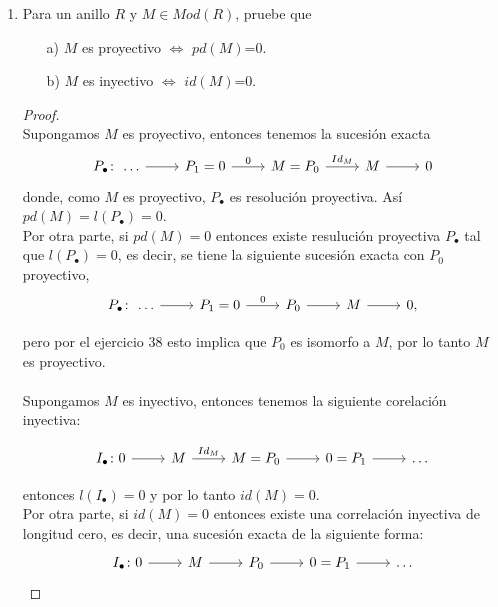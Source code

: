 \documentclass{article}
\begin{document}
\begin{enumerate}[label=\textbf{Ej \arabic*.}]
		\item Para un anillo $R$ y $M\in Mod(R)$, pruebe que 
		\begin{itemize}
			\item[a)] $M$ es proyectivo $\iff$  $pd(M)$=0.
			\item[b)] $M$ es inyectivo $\iff$  $id(M)$=0.
		\end{itemize}
		\begin{proof}
			\\
			Supongamos $M$ es proyectivo, entonces tenemos la sucesión exacta 
			\[
			\begin{tikzcd}
				P_\bullet \colon\,\ldots\arrow{r}{} & P_1=0 \arrow{r}{0}& M=P_0 \arrow{r}{Id_M} & M\arrow{r}{} &0
			\end{tikzcd}
			\]
			donde, como $M$ es proyectivo, $P_\bullet$ es resolución proyectiva. Así \\ $pd(M)=l(P_\bullet)=0$.\\
			
			Por otra parte, si $pd(M)=0$ entonces existe resulución proyectiva $P_\bullet$ tal que $l(P_\bullet)=0$, es decir, se tiene la siguiente 
			sucesión exacta con $P_0$ proyectivo,
			\[
			\begin{tikzcd}
				P_\bullet \colon\,\ldots\arrow{r}{} & P_1=0 \arrow{r}{0}& P_0 \arrow{r}{} & M\arrow{r}{} &0,
			\end{tikzcd}
			\]
			
			pero por el ejercicio 38 esto implica que $P_0$ es isomorfo a $M$, por lo tanto $M$ es proyectivo.\\
			\\
			Supongamos $M$ es inyectivo, entonces tenemos la siguiente corelación inyectiva:
			
			\[
			\begin{tikzcd}
				I_\bullet \colon 0\arrow{r}{} & M \arrow{r}{Id_M} & M=P_0\arrow{r}{} &0=P_1\arrow{r}{}&\ldots
			\end{tikzcd}
			\]
			
			entonces $l( I_\bullet)=0$ y por lo tanto $id(M)=0.$\\
			
			Por otra parte, si $id(M)=0$ entonces existe una correlación inyectiva de longitud cero, es decir, una sucesión exacta de la siguiente forma:
			\[
			\begin{tikzcd}
				I_\bullet \colon 0\arrow{r}{} & M \arrow{r}{} & P_0\arrow{r}{} &0=P_1\arrow{r}{}&\ldots
			\end{tikzcd}
			\]
			

\end{proof}
\end{enumerate}
\end{document}
